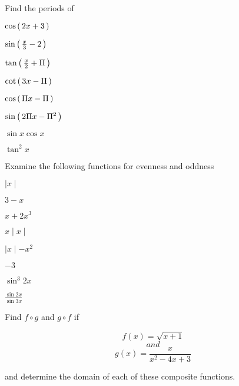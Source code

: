 \documentclass[11pt]{amsbook}
\begin{document}
\begin{hQuestion} {Find the periods of}

\begin{multicols}{3}
\begin{hEnumerateRoman}

  \item $\cos  \left( \, 2x + 3 \, \right) $
  \item $\sin  \left( \, \frac{x}{3} - 2 \, \right) $
  \item $\tan  \left( \, \frac{x}{2} + \Pi  \, \right) $
  \item $\cot  \left( \, 3x - \Pi  \, \right) $
  \item $\cos  \left( \, \Pi x - \Pi  \, \right) $ 
  \item $\sin  \left( \, 2 \Pi x - \Pi ^2  \, \right) $
  \item $\sin x \cos x $
  \item $\tan ^2 x$

\end{hEnumerateRoman}
\end{multicols}
\end{hQuestion}


\begin{hQuestion} {Examine the following functions for evenness and oddness}

\begin{multicols}{4}
\begin{hEnumerateRoman}

  \item $\mid x \mid$
  \item $ 3-x $
  \item $ x + 2 x ^3 $
  \item $ x \mid x \mid $
  \item $ \mid x \mid - x^2 $
  \item $ -3 $
  \item $ \sin ^3 2x $
  \item $ \frac{\sin 2x}{\sin 3x} $
  
\end{hEnumerateRoman}
\end{multicols}

\end{hQuestion}


\begin{hQuestion} {Find $f\circ g$ and $g \circ f $} if

\[
f(x) = \sqrt{x + 1} 
\]
\[
and
\]
\[
 g(x) = \frac{x}{x^2 - 4x +3}
\]

and determine the domain of each of these composite functions.

\end{hQuestion}
\end{document}

